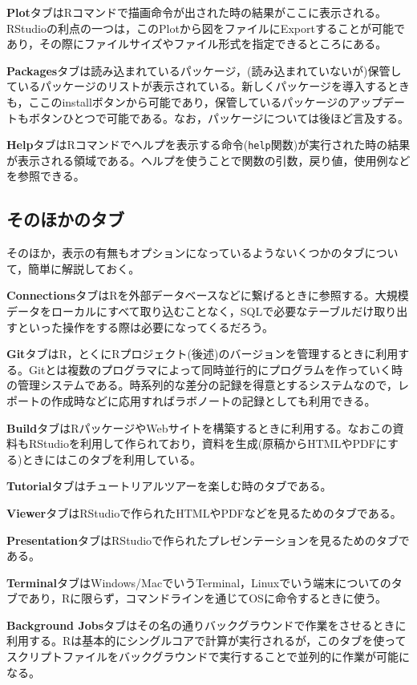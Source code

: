 \documentclass[
  a4paper,
]{ltjsbook}
\begin{document}
\textbf{Plot}タブはRコマンドで描画命令が出された時の結果がここに表示される。RStudioの利点の一つは，このPlotから図をファイルにExportすることが可能であり，その際にファイルサイズやファイル形式を指定できるところにある。

\textbf{Packages}タブは読み込まれているパッケージ，(読み込まれていないが)保管しているパッケージのリストが表示されている。新しくパッケージを導入するときも，ここのinstallボタンから可能であり，保管しているパッケージのアップデートもボタンひとつで可能である。なお，パッケージについては後ほど言及する。

\textbf{Help}タブはRコマンドでヘルプを表示する命令(\texttt{help}関数)が実行された時の結果が表示される領域である。ヘルプを使うことで関数の引数，戻り値，使用例などを参照できる。

\subsection{そのほかのタブ}\label{ux305dux306eux307bux304bux306eux30bfux30d6}

そのほか，表示の有無もオプションになっているようないくつかのタブについて，簡単に解説しておく。

\textbf{Connections}タブはRを外部データベースなどに繋げるときに参照する。大規模データをローカルにすべて取り込むことなく，SQLで必要なテーブルだけ取り出すといった操作をする際は必要になってくるだろう。

\textbf{Git}タブはR，とくにRプロジェクト(後述)のバージョンを管理するときに利用する。Gitとは複数のプログラマによって同時並行的にプログラムを作っていく時の管理システムである。時系列的な差分の記録を得意とするシステムなので，レポートの作成時などに応用すればラボノートの記録としても利用できる。

\textbf{Build}タブはRパッケージやWebサイトを構築するときに利用する。なおこの資料もRStudioを利用して作られており，資料を生成(原稿からHTMLやPDFにする)ときにはこのタブを利用している。

\textbf{Tutorial}タブはチュートリアルツアーを楽しむ時のタブである。

\textbf{Viewer}タブはRStudioで作られたHTMLやPDFなどを見るためのタブである。

\textbf{Presentation}タブはRStudioで作られたプレゼンテーションを見るためのタブである。

\textbf{Terminal}タブはWindows/MacでいうTerminal，Linuxでいう端末についてのタブであり，Rに限らず，コマンドラインを通じてOSに命令するときに使う。

\textbf{Background
Jobs}タブはその名の通りバックグラウンドで作業をさせるときに利用する。Rは基本的にシングルコアで計算が実行されるが，このタブを使ってスクリプトファイルをバックグラウンドで実行することで並列的に作業が可能になる。
\end{document}
